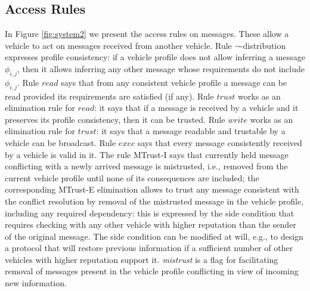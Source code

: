 \documentclass[compsoc, conference, letterpaper, 10pt, times]{IEEEtran}
\begin{document}
\subsection{Access Rules}

In Figure \ref{fig:system2} we present the access rules on messages. These allow a vehicle to act on messages received from another vehicle. Rule $\neg$-distribution expresses profile consistency: if a vehicle profile does not allow inferring a message $\phi_{i,j}$, then it allows inferring any other message whose requirements do not include $\phi_{i,j}$. Rule $\mathit{read}$ says that from any consistent vehicle profile a message can be read provided its requirements are satisfied (if any). Rule $\mathit{trust}$ works as an elimination rule for $read$: it says that if a message is received by a vehicle and it preserves its profile consistency, then it can be trusted. Rule $\mathit{write}$ works as an elimination rule for $trust$: it says that a message readable and trustable by a vehicle can be broadcast. Rule $\mathit{exec}$ says that every message consistently received by a vehicle is valid in it. The rule MTrust-I says that currently held message conflicting with a newly arrived message is mistrusted, i.e., removed from the current vehicle profile until none of its consequences are included; the corresponding MTrust-E elimination allows to trust any message consistent with the conflict resolution by removal of the mistrusted message in the vehicle profile, including any required dependency: this is expressed by the side condition that requires checking with any other vehicle with higher reputation than the sender of the original message. The side condition can be modified at will, e.g., to design a protocol that will restore previous information if a sufficient number of other vehicles with higher reputation support it. \textit{mistrust} is a flag for facilitating removal of messages present in the vehicle profile conflicting in view of incoming new information. 
\end{document}
